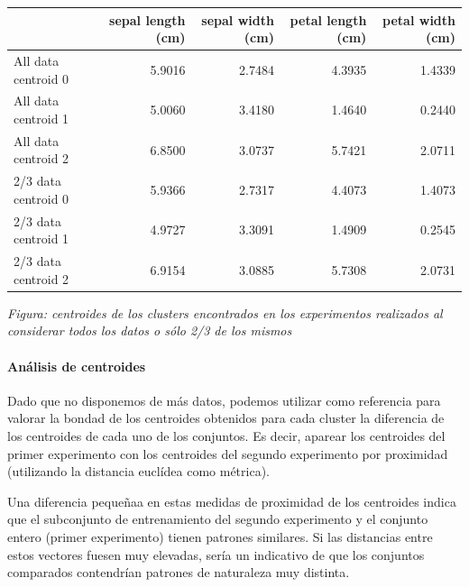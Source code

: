 \documentclass[11pt]{article}
\begin{document}
            \begin{mdframed}[hidealllines=true,backgroundcolor=green!10]
            
    
    \begin{tabular}{lrrrr}
\toprule
{} &  sepal length (cm) &  sepal width (cm) &  petal length (cm) &  petal width (cm) \\
\midrule
All data centroid 0 &             5.9016 &            2.7484 &             4.3935 &            1.4339 \\
All data centroid 1 &             5.0060 &            3.4180 &             1.4640 &            0.2440 \\
All data centroid 2 &             6.8500 &            3.0737 &             5.7421 &            2.0711 \\
2/3 data centroid 0 &             5.9366 &            2.7317 &             4.4073 &            1.4073 \\
2/3 data centroid 1 &             4.9727 &            3.3091 &             1.4909 &            0.2545 \\
2/3 data centroid 2 &             6.9154 &            3.0885 &             5.7308 &            2.0731 \\
\bottomrule
\end{tabular}

    

            \end{mdframed}
            \endgroup
    \emph{Figura: centroides de los clusters encontrados en los experimentos
realizados al considerar todos los datos o sólo 2/3 de los mismos}

\paragraph{Análisis de centroides}\label{anuxe1lisis-de-centroides}

Dado que no disponemos de más datos, podemos utilizar como referencia
para valorar la bondad de los centroides obtenidos para cada cluster la
diferencia de los centroides de cada uno de los conjuntos. Es decir,
aparear los centroides del primer experimento con los centroides del
segundo experimento por proximidad (utilizando la distancia euclídea
como métrica).

Una diferencia pequeñaa en estas medidas de proximidad de los centroides
indica que el subconjunto de entrenamiento del segundo experimento y el
conjunto entero (primer experimento) tienen patrones similares. Si las
distancias entre estos vectores fuesen muy elevadas, sería un indicativo
de que los conjuntos comparados contendrían patrones de naturaleza muy
distinta.
\end{document}
